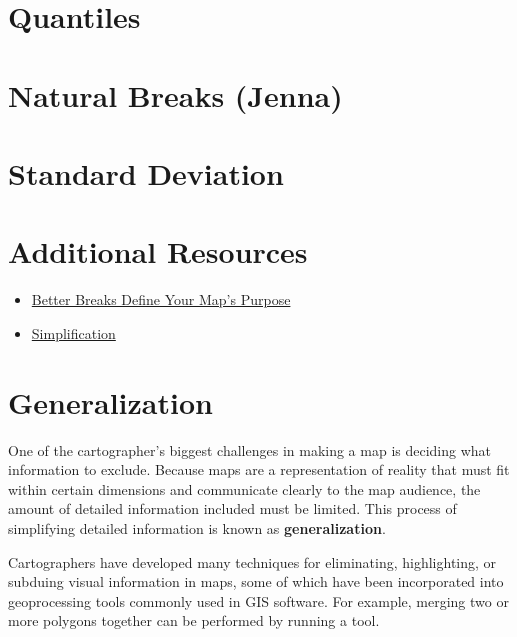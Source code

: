 \documentclass[
]{book}
\begin{document}
\hypertarget{quantiles}{%
\section{Quantiles}\label{quantiles}}

\hypertarget{natural-breaks-jenna}{%
\section{Natural Breaks (Jenna)}\label{natural-breaks-jenna}}

\hypertarget{standard-deviation}{%
\section{Standard Deviation}\label{standard-deviation}}

\hypertarget{additional-resources-2}{%
\section{Additional Resources}\label{additional-resources-2}}

\begin{itemize}
\item
  \href{https://www.esri.com/arcgis-blog/products/arcgis-online/mapping/better-breaks-define-your-maps-purpose/}{Better Breaks Define Your Map's Purpose}
\item
  \href{https://open.lib.umn.edu/mapping/chapter/5-simplification/}{Simplification}
\end{itemize}

\hypertarget{generalization}{%
\section{Generalization}\label{generalization}}

One of the cartographer's biggest challenges in making a map is deciding what information to exclude. Because maps are a representation of reality that must fit within certain dimensions and communicate clearly to the map audience, the amount of detailed information included must be limited. This process of simplifying detailed information is known as \textbf{generalization}.

Cartographers have developed many techniques for eliminating, highlighting, or subduing visual information in maps, some of which have been incorporated into geoprocessing tools commonly used in GIS software. For example, merging two or more polygons together can be performed by running a tool.
\end{document}
